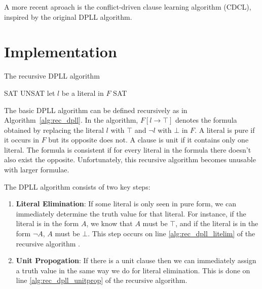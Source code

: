 \documentclass[10pt,AMS Euler]{article}
\begin{document}
A more recent aproach is the conflict-driven clause learning algorithm (CDCL), inspired by the original DPLL
algorithm. 

\section*{Implementation}
\label{sec:orgbd91c40}
\begin{algorithm}
\caption{The recursive DPLL algorithm}
\label{alg:rec_dpll}
\begin{algorithmic}[1]
  \State \Return SAT
  \State \Return UNSAT
 \label{alg:rec_dpll_litelim}
  \State \Return {}
 \label{alg:rec_dpll_unitprop}
  \State \Return {}
\Else
  \State let $l$ be a literal in $F$
    \State \Return SAT
  \Else
    \State \Return {}
  \EndIf
\EndIf
\EndFunction
\end{algorithmic}
\end{algorithm}

The basic DPLL algorithm can be defined recursively as in Algorithm~\ref{alg:rec_dpll}.
In the algorithm, \(F[l \to \top]\) denotes the formula obtained by replacing the literal \(l\) with \(\top\) and
\(\neg l\) with \(\bot\) in \(F\). A literal is pure if it occurs in \(F\) but its opposite does not. A clause is unit
if it contains only one literal. The formula is consistent if for every literal in the formula there doesn't
also exist the opposite. Unfortunately, this recursive algorithm becomes unusable with larger formulae.

The DPLL algorithm consists of two key steps:
\begin{enumerate}
\item \textbf{Literal Elimination}: If some literal is only seen in pure form, we can immediately determine the
truth value for that literal. For instance, if the literal is in the form \(A\), we know that \(A\) must be
\(\top\), and if the literal is in the form \(\neg A\), \(A\) must be \(\bot\). This step occurs on line
\ref{alg:rec_dpll_litelim} of the recursive algorithm .
\item \textbf{Unit Propogation}: If there is a unit clause then we can immediately assign a truth value in the same
way we do for literal elimination. This is done on line \ref{alg:rec_dpll_unitprop} of the recursive
algorithm.
\end{enumerate}
\end{document}
